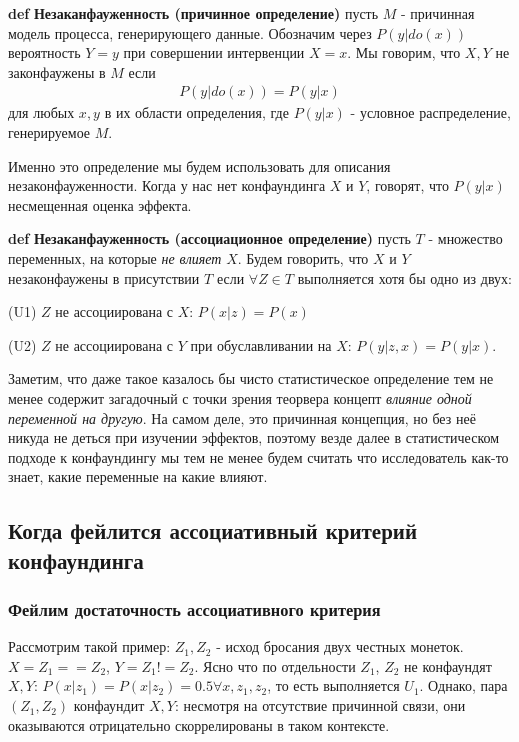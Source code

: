 \documentclass[fleqn]{article}
\def\define#1{\textbf{def} \textbf{#1}}
\numberwithin{equation}{section}
\numberwithin{theorem}{section}
\numberwithin{figure}{section}
\numberwithin{lemma}{section}
\numberwithin{corollary}{section}
\begin{document}
\define{Незаканфауженность (причинное определение)} пусть $M$ - причинная модель процесса, генерирующего данные. Обозначим через $P(y|do(x))$ вероятность $Y = y$ при совершении интервенции $X=x$. Мы говорим, что $X, Y$  не законфаужены в $M$ если 
\begin{align}
	P(y|do(x)) = P(y|x)
\end{align}
для любых $x,y$ в их области определения, где $P(y|x)$ - условное распределение, генерируемое $M$.

Именно это определение мы будем использовать для описания незаконфауженности. Когда у нас нет конфаундинга $X$ и $Y$, говорят, что $P(y|x)$ несмещенная оценка эффекта.

\define{Незаканфауженность (ассоциационное определение)} пусть $T$ - множество переменных, на которые \textit{не влияет} $X$. Будем говорить, что $X$ и $Y$ незаконфаужены в присутствии $T$ если $\forall Z \in T$ выполняется хотя бы одно из двух:

(U1) $Z$ не ассоциирована с $X$: $P(x|z) = P(x)$

(U2) $Z$ не ассоциирована с $Y$ при обуславливании на $X$: $P(y|z,x) = P(y|x)$.


Заметим, что даже такое казалось бы чисто статистическое определение тем не менее содержит загадочный с точки зрения теорвера концепт \textit{влияние одной переменной на другую}. На самом деле, это причинная концепция, но без неё никуда не деться при изучении эффектов, поэтому везде далее в статистическом подходе к конфаундингу мы тем не менее будем считать что исследователь как-то знает, какие переменные на какие влияют. 

\subsection*{Когда фейлится ассоциативный критерий конфаундинга}

\subsubsection*{Фейлим  достаточность ассоциативного критерия}

Рассмотрим такой пример: $Z_1, Z_2$ - исход бросания двух честных монеток. $X = Z_1 == Z_2$, $Y = Z_1 != Z_2$. Ясно что по отдельности $Z_1$, $Z_2$ не конфаундят $X,Y$: $P(x|z_1) = P(x|z_2) = 0.5 \forall x, z_1, z_2$, то есть выполняется $U_1$. Однако, пара $(Z_1,Z_2)$ конфаундит $X,Y$: несмотря на отсутствие причинной связи, они оказываются отрицательно скоррелированы в таком контексте. 
\end{document}
